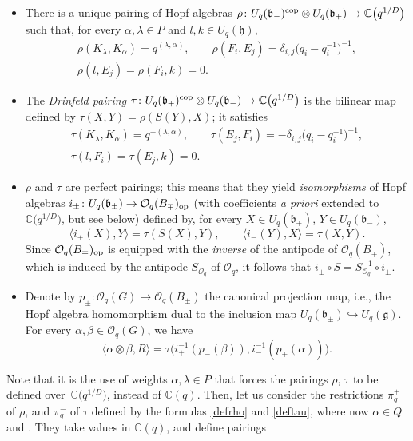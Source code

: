 \documentclass[pdftex]{sigma}
\numberwithin{equation}{section}
\theoremstyle{definition}
\newcommand{\Oq}{\Oo_{q}}
\newcommand{\mc}{\mathbb{C}}
\newcommand{\Oo}{{\mathcal O}}
\newcommand{\ra}{\rightarrow}
\begin{document}
\begin{itemize}\itemsep=0pt
\item There is a unique pairing of Hopf algebras $\rho \colon U_q(\mathfrak{b}_-)^{\rm cop}\otimes U_q(\mathfrak{b}_+)\ra \mc\big(q^{1/D}\big)$ such that, for every $\alpha,\lambda\in P$ and $l,k\in U_q(\mathfrak{h})$,
\begin{gather}
\rho(K_\lambda,K_\alpha) = q^{(\lambda, \alpha)} ,\qquad \rho(F_i,E_j) = \delta_{i,j}\big(q_i-q_i^{-1}\big)^{-1},\nonumber \\
\rho(l,E_j) = \rho(F_i,k)=0.\label{defrho}
\end{gather}
\item The {\it Drinfeld pairing} $\tau \colon U_q(\mathfrak{b}_+)^{\rm cop}\otimes U_q(\mathfrak{b}_-)\ra \mc\big(q^{1/D}\big)$ is the bilinear map defined by $\tau(X,Y) = \rho(S(Y),X)$; it satisfies
\begin{gather}
\tau(K_\lambda,K_\alpha) = q^{-(\lambda, \alpha)} ,\qquad\tau(E_j,F_i) = - \delta_{i,j}\big(q_i-q_i^{-1}\big)^{-1} ,\nonumber\\
 \tau(l,F_i) = \tau(E_j,k)=0.\label{deftau}
\end{gather}
\item $\rho$ and $\tau$ are perfect pairings; this means that they yield {\it isomorphisms} of Hopf algebras $i_\pm \colon U_q(\mathfrak{b}_\pm) \ra \Oo_q(B_\mp)_{\rm op}$ (with coefficients {\it a priori} extended to $\mc\big(q^{1/D}\big)$, but see below) defined by, for every $X\in U_q(\mathfrak{b}_+)$, $Y\in U_q(\mathfrak{b}_-)$,
 \[\langle i_+(X), Y\rangle = \tau(S(X),Y),\qquad\langle i_-(Y) , X \rangle = \tau(X,Y).\]
Since $\Oo_q(B_\mp)_{\rm op}$ is equipped with the {\it inverse} of the antipode of $\Oo_q(B_\mp)$, which is induced by the antipode $S_{\Oq}$ of $\Oo_q$, it follows that $i_\pm \circ S = S_{\Oq}^{-1} \circ i_\pm$.
\item Denote by $p_\pm \colon \Oo_q(G) \ra \Oo_q(B_\pm)$ the canonical projection map, i.e., the Hopf algebra homomorphism dual to the inclusion map $U_q(\mathfrak{b}_\pm) \hookrightarrow U_q(\mathfrak{g})$. For every $\alpha,\beta \in \Oo_q(G)$, we have
\begin{equation}\label{Rpair}
\langle\alpha \otimes \beta , R \rangle = \tau \big(i_+^{-1}(p_-(\beta)), i_-^{-1}(p_+(\alpha))\big).
\end{equation}
\end{itemize}
Note that it is the use of weights $\alpha,\lambda\in P$ that forces the pairings $\rho$, $\tau$ to be defined over~$\mc\big(q^{1/D}\big)$, instead of $\mc(q)$. Then, let us consider the restrictions $\pi_q^+$ of $\rho$, and $\pi_q^-$ of $\tau$ defined by the formulas \eqref{defrho} and \eqref{deftau}, where now $\alpha\in Q$ and . They take values in $\mc(q)$, and define pairings
\end{document}
